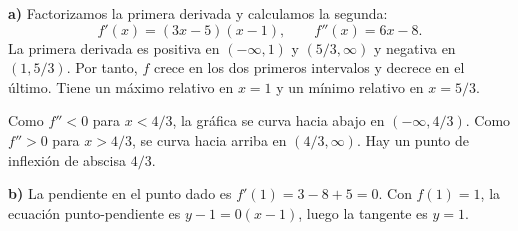 \textbf{a)} Factorizamos la primera derivada y calculamos la segunda:
\[
 f'(x)=(3x-5)(x-1),\qquad f''(x)=6x-8.
\]
La primera derivada es positiva en $(-\infty,1)$ y $(5/3,\infty)$ y negativa en $(1,5/3)$. Por tanto, $f$ crece en los dos primeros intervalos y decrece en el último. Tiene un máximo relativo en $x=1$ y un mínimo relativo en $x=5/3$.

Como $f''<0$ para $x<4/3$, la gráfica se curva hacia abajo en $(-\infty,4/3)$. Como $f''>0$ para $x>4/3$, se curva hacia arriba en $(4/3,\infty)$. Hay un punto de inflexión de abscisa $4/3$.

\textbf{b)} La pendiente en el punto dado es $f'(1)=3-8+5=0$. Con $f(1)=1$, la ecuación punto-pendiente es $y-1=0(x-1)$, luego la tangente es $\boxed{y=1}$.
